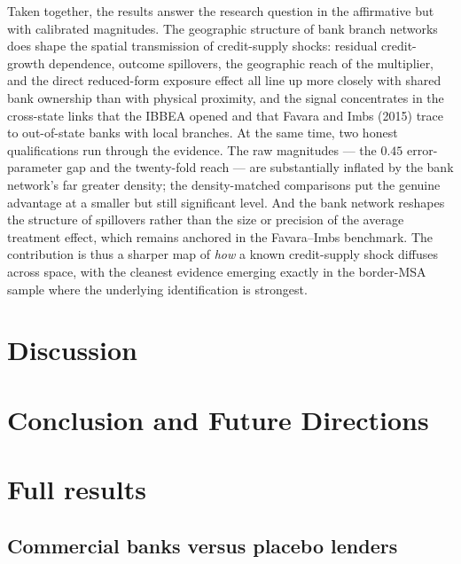 Taken together, the results answer the research question in the affirmative but
with calibrated magnitudes. The geographic structure of bank branch networks does
shape the spatial transmission of credit-supply shocks: residual credit-growth
dependence, outcome spillovers, the geographic reach of the multiplier, and the
direct reduced-form exposure effect all line up more closely with shared bank
ownership than with physical proximity, and the signal concentrates in the
cross-state links that the IBBEA opened and that Favara and Imbs (2015) trace to
out-of-state banks with local branches. At the same time, two honest qualifications
run through the evidence. The raw magnitudes --- the $0.45$ error-parameter gap and
the twenty-fold reach --- are substantially inflated by the bank network's far
greater density; the density-matched comparisons put the genuine advantage at a
smaller but still significant level. And the bank network reshapes the structure
of spillovers rather than the size or precision of the average treatment effect,
which remains anchored in the Favara--Imbs benchmark. The contribution is thus a
sharper map of \emph{how} a known credit-supply shock diffuses across space, with
the cleanest evidence emerging exactly in the border-MSA sample where the
underlying identification is strongest.

\section{Discussion}\label{sec:disc}

\section{Conclusion and Future Directions}\label{sec:concl}


\clearpage

 


\clearpage

\appendix
\section{Full results}
\label{app:results}
 
\subsection{Commercial banks versus placebo lenders}

